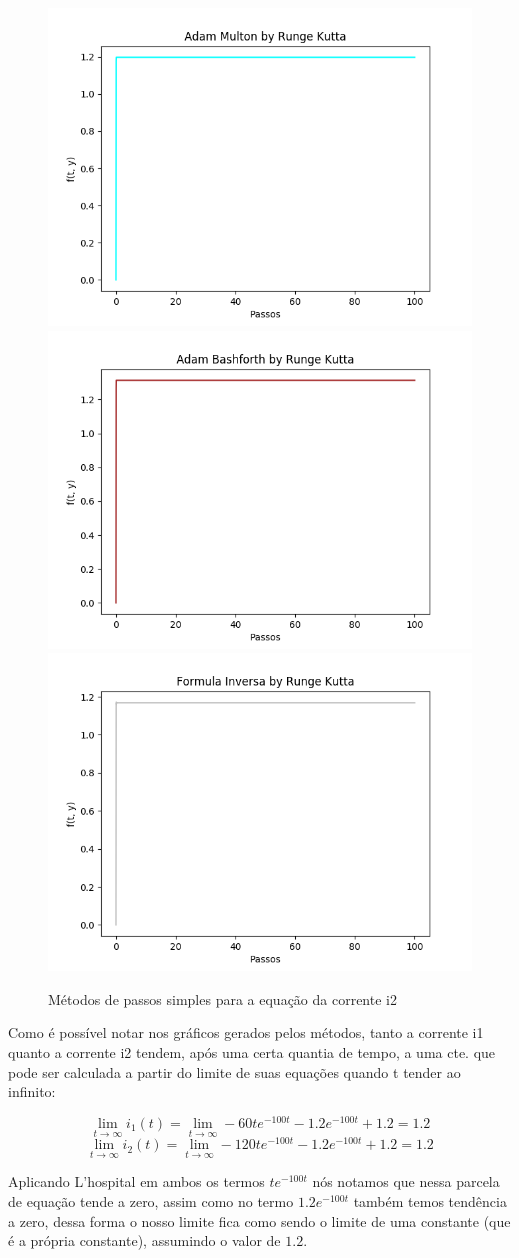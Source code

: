 \documentclass[12pt]{article}%
\begin{document}
    \begin{figure}[H]
        \begin{center}
            \includegraphics[width=.4\textwidth]{problemas/metodos_q2/circuito2_multon.png}
            \includegraphics[width=.4\textwidth]{problemas/metodos_q2/circuito2_bashforth.png}
            \includegraphics[width=.4\textwidth]{problemas/metodos_q2/circuito2_inversa.png}
        \end{center}
        \caption{Métodos de passos simples para a equação da corrente i2}
    \end{figure}
    
    Como é possível notar nos gráficos gerados pelos métodos, tanto a corrente i1 quanto a corrente i2 tendem, após uma certa quantia de tempo, a uma cte. que pode ser calculada a partir do limite de suas equações quando t tender ao infinito:
    
    \[\lim_{t\to\infty} i_{1}(t) = \lim_{t\to\infty} -60te^{-100t}-1.2e^{-100t} + 1.2 = 1.2\]
    \[\lim_{t\to\infty} i_{2}(t) = \lim_{t\to\infty} -120te^{-100t}-1.2e^{-100t} + 1.2 = 1.2\]
    
    Aplicando L'hospital em ambos os termos \(te^{-100t}\) nós notamos que nessa parcela de equação tende a zero, assim como no termo \(1.2e^{-100t}\) também temos tendência a zero, dessa forma o nosso limite fica como sendo o limite de uma constante (que é a própria constante), assumindo o valor de \(1.2\).
    
\end{document}
